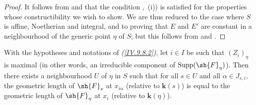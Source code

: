 \begin{proof}
\label{IV.9.8.5-proof}
It follows from  and  that the condition ,~(i)) is satisfied for the properties whose constructibility we wish to show.
We are thus reduced to the case where $S$ is affine, Noetherian and integral, and to proving that $E$ and $E'$ are constant in a neighbourhood of the generic point $\eta$ of $S$; but this follows from  and .
\end{proof}

\begin{proposition}[9.8.6]
\label{IV.9.8.6}
With the hypotheses and notations of \emph{(\ref{IV.9.8.2})}, let $i\in I$ be such that $(Z_i)_\eta$ is maximal (in other words, an irreducible component of $\operatorname{Supp}(\sh{F}_\eta)$).
Then there exists a neighbourhood $U$ of $\eta$ in $S$ such that for all $s\in U$ and all $\alpha\in J_{s,i}$, the geometric length of $\sh{F}_s$ at $x_{i\alpha}$ (relative to $\mathbf{k}(s)$)  is equal to the geometric length of $\sh{F}_\eta$ at $x_i$ (relative to $\mathbf{k}(\eta)$).
\end{proposition}

